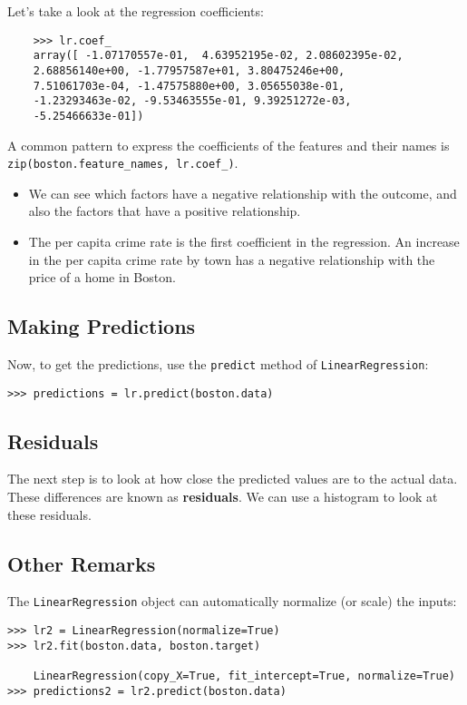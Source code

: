 \documentclass[SKL-MASTER.tex]{subfiles}
\begin{document}
Let's take a look at the regression coefficients:
\begin{framed}
	\begin{verbatim}
	>>> lr.coef_
	array([ -1.07170557e-01,  4.63952195e-02, 2.08602395e-02,
	2.68856140e+00, -1.77957587e+01, 3.80475246e+00,
	7.51061703e-04, -1.47575880e+00, 3.05655038e-01,
	-1.23293463e-02, -9.53463555e-01, 9.39251272e-03,
	-5.25466633e-01])
	\end{verbatim}
\end{framed}

A common pattern to express the coefficients of the features and
their names is \texttt{zip(boston.feature\_names, lr.coef\_)}.

\begin{itemize}
\item We can see which factors have a negative relationship with the
outcome, and also the factors that have a positive relationship. 
\item The per capita crime rate is the first coefficient in the regression. An increase in the per capita crime rate by town has a negative relationship with the price of a
home in Boston. 
\end{itemize}



\subsection*{Making Predictions}
Now, to get the predictions, use the \texttt{predict} method of
\texttt{LinearRegression}:

\begin{framed}
\begin{verbatim}
>>> predictions = lr.predict(boston.data)
\end{verbatim}
\end{framed}

\subsection*{Residuals}
The next step is to look at how close the predicted values are to the actual data. These differences are known as \textbf{residuals}.
We can use a histogram to look at these residuals.


\subsection*{Other Remarks}
The \texttt{LinearRegression} object can automatically normalize (or scale) the inputs:
\begin{framed}
\begin{verbatim}
>>> lr2 = LinearRegression(normalize=True)
>>> lr2.fit(boston.data, boston.target)

	LinearRegression(copy_X=True, fit_intercept=True, normalize=True)
>>> predictions2 = lr2.predict(boston.data)
\end{verbatim}
\end{framed}
\end{document}
